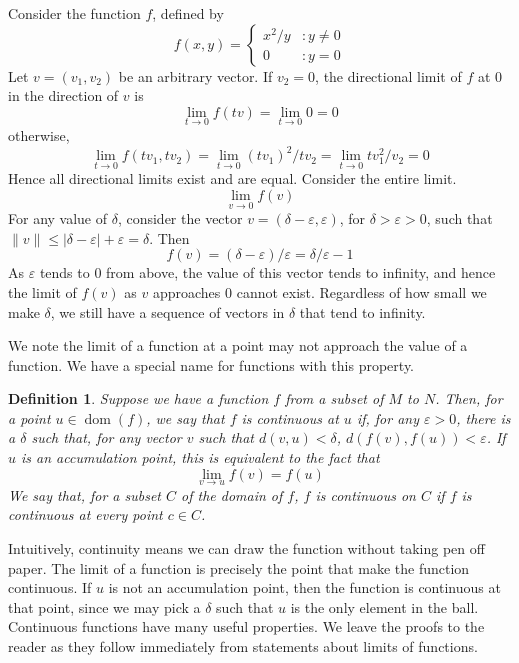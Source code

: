 \documentclass[12pt]{amsbook}
\theoremstyle{plain}
\newtheorem{definition}{Definition}
\theoremstyle{definition}
\DeclareMathOperator{\dom}{dom}
\begin{document}
Consider the function $f$, defined by
%
\[ f(x,y) = \left\{
     \begin{array}{lr}
       x^2/y & : y \neq 0\\
       0 & : y = 0
     \end{array}
   \right.\]
%
Let $v = (v_1, v_2)$ be an arbitrary vector. If $v_2 = 0$, the directional limit of $f$ at 0 in the direction of $v$ is
%
\[ \lim_{t \to 0} f(tv) = \lim_{t \to 0} 0 = 0 \]
%
otherwise,
%
\[ \lim_{t \to 0} f(tv_1, tv_2) = \lim_{t \to 0} (tv_1)^2/tv_2 = \lim_{t \to 0} t v_1^2/v_2 = 0 \]
%
Hence all directional limits exist and are equal. Consider the entire limit.
%
\[ \lim_{v \to 0} f(v) \]
%
For any value of $\delta$, consider the vector $v = (\delta - \varepsilon, \varepsilon)$, for $\delta > \varepsilon > 0$, such that $\|v\| \leq |\delta - \varepsilon| + \varepsilon = \delta$. Then
%
\[ f(v) = (\delta - \varepsilon)/\varepsilon = \delta/\varepsilon - 1 \]
%
As $\varepsilon$ tends to 0 from above, the value of this vector tends to infinity, and hence the limit of $f(v)$ as $v$ approaches 0 cannot exist. Regardless of how small we make $\delta$, we still have a sequence of vectors in $\delta$ that tend to infinity.

We note the limit of a function at a point may not approach the value of a function. We have a special name for functions with this property.

\begin{definition}
  Suppose we have a function $f$ from a subset of $M$ to $N$. Then, for a point $u \in \dom(f)$, we say that $f$ is continuous at $u$ if, for any $\varepsilon > 0$, there is a $\delta$ such that, for any vector $v$ such that $d(v, u) < \delta$, $d(f(v), f(u)) < \varepsilon$. If $u$ is an accumulation point, this is equivalent to the fact that
  \[ \lim_{v \to u} f(v) = f(u) \]
  We say that, for a subset $C$ of the domain of $f$, $f$ is continuous on $C$ if $f$ is continuous at every point $c \in C$.
\end{definition}

Intuitively, continuity means we can draw the function without taking pen off paper. The limit of a function is precisely the point that make the function continuous. If $u$ is not an accumulation point, then the function is continuous at that point, since we may pick a $\delta$ such that $u$ is the only element in the ball. Continuous functions have many useful properties. We leave the proofs to the reader as they follow immediately from statements about limits of functions.
\end{document}
